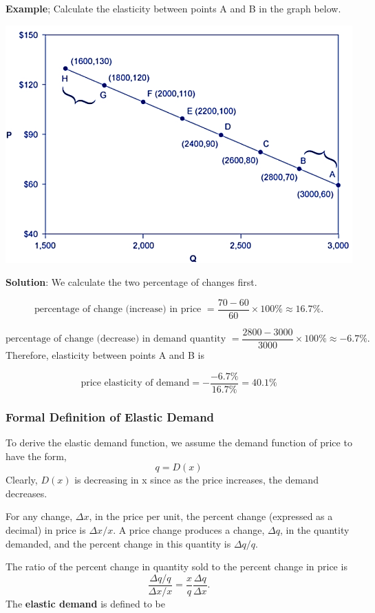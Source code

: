 \documentclass[
]{book}
\begin{document}
\textbf{Example}; Calculate the elasticity between points A and B in the graph below.

\begin{center}\includegraphics[width=0.7\linewidth]{img10/w10-elasticdemandExample} \end{center}

\textbf{Solution}: We calculate the two percentage of changes first.

\[
\text{percentage of change (increase) in price } = \frac{70-60}{60}\times 100\% \approx 16.7\%. 
\]

\[
\text{percentage of change (decrease) in demand quantity } = \frac{2800 - 3000}{3000}\times 100\% \approx -6.7\%. 
\]
Therefore, elasticity between points A and B is

\[
\text{price elasticity of demand} = -\frac{-6.7\%}{16.7\%} = 40.1\%
\]

\hfill\break

\hypertarget{formal-definition-of-elastic-demand}{%
\subsubsection{Formal Definition of Elastic Demand}\label{formal-definition-of-elastic-demand}}

To derive the elastic demand function, we assume the demand function of price to have the form,
\[
q = D(x)
\]
Clearly, \(D(x)\) is decreasing in x since as the price increases, the demand decreases.

For any change, \(\Delta x\), in the price per unit, the percent change (expressed as a decimal) in price is \(\Delta x/x\). A price change produces a change, \(\Delta q\), in the quantity demanded, and the percent change in this quantity is \(\Delta q/q\).

The ratio of the percent change in quantity sold to the percent change in price is
\[
\frac{\Delta q/q}{\Delta x/x} = \frac{x}{q}\frac{\Delta q}{\Delta x}.
\]
The \textbf{elastic demand} is defined to be
\end{document}
